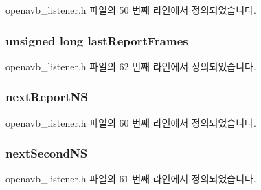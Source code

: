 openavb\+\_\+listener.\+h 파일의 50 번째 라인에서 정의되었습니다.

\subsubsection[{\texorpdfstring{last\+Report\+Frames}{lastReportFrames}}]{\setlength{\rightskip}{0pt plus 5cm}unsigned long last\+Report\+Frames}\hypertarget{structlistener__data__t_afcd18ba6ccac35cfc976d61591b8a718}{}\label{structlistener__data__t_afcd18ba6ccac35cfc976d61591b8a718}


openavb\+\_\+listener.\+h 파일의 62 번째 라인에서 정의되었습니다.

\subsubsection[{\texorpdfstring{next\+Report\+NS}{nextReportNS}}]{ next\+Report\+NS}\hypertarget{structlistener__data__t_a9ed17cd4b781b5f67b657069d5b4382f}{}\label{structlistener__data__t_a9ed17cd4b781b5f67b657069d5b4382f}


openavb\+\_\+listener.\+h 파일의 60 번째 라인에서 정의되었습니다.

\subsubsection[{\texorpdfstring{next\+Second\+NS}{nextSecondNS}}]{ next\+Second\+NS}\hypertarget{structlistener__data__t_af7e8f07dc431af3a82b4ee9b960772ce}{}\label{structlistener__data__t_af7e8f07dc431af3a82b4ee9b960772ce}


openavb\+\_\+listener.\+h 파일의 61 번째 라인에서 정의되었습니다.

